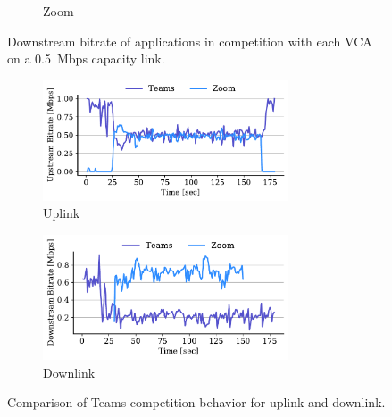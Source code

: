 \begin{figure}[t!]
\begin{subfigure}[t]{.33\textwidth}
    \caption{Zoom}
    \label{fig:zoom-dl-boxplot-0.5}
\end{subfigure}
\caption{Downstream bitrate of applications in competition with each VCA on a 0.5~Mbps capacity link.}
\label{fig:dnld-boxplot}
\end{figure}

\begin{figure}[t!]
\centering
\begin{subfigure}[t]{.5\textwidth}
    \centering
    \includegraphics[width=0.8\textwidth]{figures/comp_ts/teams_zoom_1_ul_r2.pdf}
    \caption{Uplink}
    \label{fig:teams-zoom-up-1}
\end{subfigure}\hfill
\begin{subfigure}[t]{.5\textwidth}
    \centering
    \includegraphics[width=0.8\textwidth]{figures/comp_ts/teams_zoom_1_dl_r2.pdf}
    \caption{Downlink}
    \label{fig:teams-zoom-down-1}
\end{subfigure}
\caption{Comparison of Teams competition behavior for uplink and downlink.}
\label{fig:teams-zoom-1}
\end{figure}


